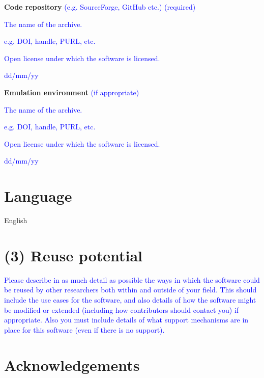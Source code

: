 \documentclass{jors}
\begin{document}
{\bf Code repository} \textcolor{blue}{(e.g. SourceForge, GitHub etc.) (required)}

\begin{description}[noitemsep,topsep=0pt]
	\item[Name:] \textcolor{blue}{The name of the archive.}
	\item[Persistent identifier:] \textcolor{blue}{e.g. DOI, handle, PURL, etc.}
	\item[Licence:] \textcolor{blue}{Open license under which the software is licensed.}
	\item[Date published:] \textcolor{blue}{dd/mm/yy}
\end{description}

{\bf Emulation environment} \textcolor{blue}{(if appropriate)}

\begin{description}[noitemsep,topsep=0pt]
	\item[Name:] \textcolor{blue}{The name of the archive.}
	\item[Persistent identifier:] \textcolor{blue}{e.g. DOI, handle, PURL, etc.}
	\item[Licence:] \textcolor{blue}{Open license under which the software is licensed.}
	\item[Date published:] \textcolor{blue}{dd/mm/yy}
\end{description}

\section*{Language}

English

\section*{(3) Reuse potential}

\textcolor{blue}{Please describe in as much detail as possible the ways in which the software could be reused by other researchers both within and outside of your field. This should include the use cases for the software, and also details of how the software might be modified or extended (including how contributors should contact you) if appropriate. Also you must include details of what support mechanisms are in place for this software (even if there is no support).}

\section*{Acknowledgements}
\end{document}

